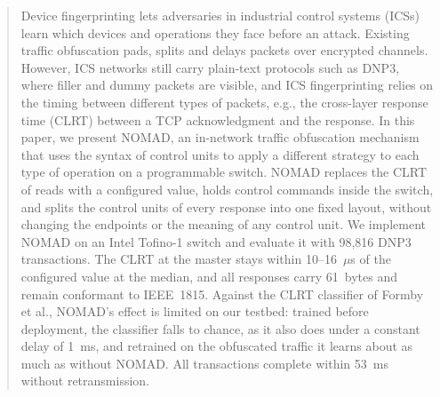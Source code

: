 \begin{abstract}
Device fingerprinting lets adversaries in industrial control systems (ICSs) learn which devices and operations they face before an attack. Existing traffic obfuscation pads, splits and delays packets over encrypted channels. However, ICS networks still carry plain-text protocols such as DNP3, where filler and dummy packets are visible, and ICS fingerprinting relies on the timing between different types of packets, e.g., the cross-layer response time (CLRT) between a TCP acknowledgment and the response. In this paper, we present NOMAD, an in-network traffic obfuscation mechanism that uses the syntax of control units to apply a different strategy to each type of operation on a programmable switch. NOMAD replaces the CLRT of reads with a configured value, holds control commands inside the switch, and splits the control units of every response into one fixed layout, without changing the endpoints or the meaning of any control unit. We implement NOMAD on an Intel Tofino-1 switch and evaluate it with 98,816 DNP3 transactions. The CLRT at the master stays within 10--16~$\mu$s of the configured value at the median, and all responses carry 61~bytes and remain conformant to IEEE~1815. Against the CLRT classifier of Formby et al., NOMAD's effect is limited on our testbed: trained before deployment, the classifier falls to chance, as it also does under a constant delay of 1~ms, and retrained on the obfuscated traffic it learns about as much as without NOMAD. All transactions complete within 53~ms without retransmission.
\end{abstract}

